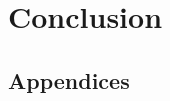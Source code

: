 \documentclass{l4proj}
\begin{document}
\chapter{Conclusion}    

%
% 

\begin{appendices}

\chapter{Appendices}

%
%
%
%
%

\end{appendices}
\end{document}
